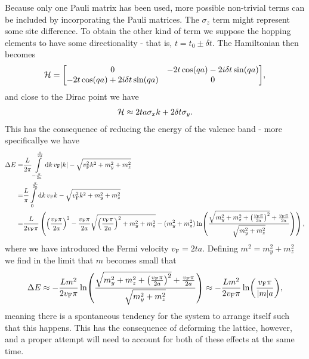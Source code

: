 Because only one Pauli matrix has been used, more possible non-trivial terms can be included by incorporating the Pauli matrices. The $\sigma_{z}$ term might represent some site difference. To obtain the other kind of term we suppose the hopping elements to have some directionality - that is, $t = t_{0} \pm \delta t$. The Hamiltonian then becomes
\begin{align*}
	\ham = \mqty[
		0                                & -2t\cos(qa) - 2i\delta t\sin(qa) \\
		-2t\cos(qa) + 2i\delta t\sin(qa) & 0
	],
\end{align*}
and close to the Dirac point we have
\begin{align*}
	\mathcal{H} \approx 2ta\sigma_{x}k + 2\delta t\sigma_{y}.
\end{align*}
This has the consequence of reducing the energy of the valence band - more specificallye we have
\begin{align*}
	\Delta E =& \frac{L}{2\pi}\int\limits_{-\frac{\pi}{2a}}^{\frac{\pi}{2a}}\dd{k}v_{\text{F}}\abs{k} - \sqrt{v_{\text{F}}^{2}k^{2} + m_{y}^{2} + m_{z}^{2}} \\
	         =& \frac{L}{\pi}\int\limits_{0}^{\frac{\pi}{2a}}\dd{k}v_{\text{F}}k - \sqrt{v_{\text{F}}^{2}k^{2} + m_{y}^{2} + m_{z}^{2}} \\
	         =& \frac{L}{2v_{\text{F}}\pi}\left(\left(\frac{v_{\text{F}}\pi}{2a}\right)^{2} - \frac{v_{\text{F}}\pi}{2a}\sqrt{\left(\frac{v_{\text{F}}\pi}{2a}\right)^{2} + m_{y}^{2} + m_{z}^{2}} - (m_{y}^{2} + m_{z}^{2})\ln(\frac{\sqrt{m_{y}^{2} + m_{z}^{2} + \left(\frac{v_{\text{F}}\pi}{2a}\right)^{2}} + \frac{v_{\text{F}}\pi}{2a}}{\sqrt{m_{y}^{2} + m_{z}^{2}}})\right),
\end{align*}
where we have introduced the Fermi velocity $v_{\text{F}} = 2ta$. Defining $m^{2} = m_{y}^{2} + m_{z}^{2}$ we find in the limit that $m$ becomes small that
\begin{align*}
	\Delta E \approx -\frac{Lm^{2}}{2v_{\text{F}}\pi}\ln(\frac{\sqrt{m_{y}^{2} + m_{z}^{2} + \left(\frac{v_{\text{F}}\pi}{2a}\right)^{2}} + \frac{v_{\text{F}}\pi}{2a}}{\sqrt{m_{y}^{2} + m_{z}^{2}}}) \approx -\frac{Lm^{2}}{2v_{\text{F}}\pi}\ln(\frac{v_{\text{F}}\pi}{\abs{m}a}),
\end{align*}
meaning there is a spontaneous tendency for the system to arrange itself such that this happens. This has the consequence of deforming the lattice, however, and a proper attempt will need to account for both of these effects at the same time.

